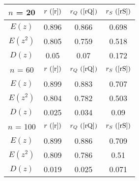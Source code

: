 \begin{tabular}{|c|c|c|c|}
\hline
$n$ = 20 & $r ~(\ref{r})$ & $r_Q ~(\ref{rQ})$ & $r_S ~(\ref{rS})$\\
\hline
$E(z)$ & 0.896 & 0.866 & 0.698\\
\hline
$E(z^2)$ & 0.805 & 0.759 & 0.518\\
\hline
$D(z)$ & 0.05 & 0.07 & 0.172\\
\hline
$n$ = 60 & $r ~(\ref{r})$ & $r_Q ~(\ref{rQ})$ & $r_S ~(\ref{rS})$\\
\hline
$E(z)$ & 0.899 & 0.883 & 0.707\\
\hline
$E(z^2)$ & 0.804 & 0.782 & 0.503\\
\hline
$D(z)$ & 0.025 & 0.034 & 0.09\\
\hline
$n$ = 100 & $r ~(\ref{r})$ & $r_Q ~(\ref{rQ})$ & $r_S ~(\ref{rS})$\\
\hline
$E(z)$ & 0.899 & 0.886 & 0.709\\
\hline
$E(z^2)$ & 0.809 & 0.786 & 0.51\\
\hline
$D(z)$ & 0.019 & 0.025 & 0.071\\
\hline
\end{tabular}